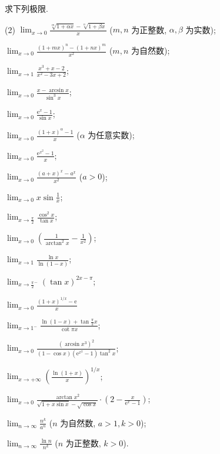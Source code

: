 \begin{exercise}[3.4.5]
    求下列极限.
    \begin{tasks}(2)
        \task* $\displaystyle \lim_{x \to 0} \frac{\sqrt[m]{1 + \alpha x} - \sqrt[n]{1 + \beta x}}{x}$ ($m, n$ 为正整数, $\alpha, \beta$ 为实数);

        \task* $\displaystyle \lim_{x \to 0} \frac{(1 + m x)^n - (1 + n x)^m}{x^2}$ ($m, n$ 为自然数);

        \task
        $\displaystyle \lim_{x \to 1} \frac{x^3 + x - 2}{x^2 - 3x + 2}$;

        \task
        $\displaystyle \lim_{x \to 0} \frac{x - \arcsin x}{\sin^3 x}$;

        \task
        $\displaystyle \lim_{x \to 0} \frac{\mathrm{e}^x - 1}{\sin x}$;

        \task
        $\displaystyle \lim_{x \to 0} \frac{(1 + x)^\alpha - 1}{x}$ ($\alpha$ 为任意实数);

        \task
        $\displaystyle \lim_{x \to 0} \frac{\mathrm{e}^{x^2} - 1}{x}$;

        \task
        $\displaystyle \lim_{x \to 0} \frac{(a + x)^x - a^x}{x^2}$ ($a > 0$);

        \task
        $\displaystyle \lim_{x \to 0} x \sin \frac{1}{x}$;

        \task
        $\displaystyle \lim_{x \to \frac{\pi}{2}} \frac{\cos^2 x}{\tan x}$;

        \task
        $\displaystyle \lim_{x \to 0} \left(\frac{1}{\arctan^2 x} - \frac{1}{x^2}\right)$;

        \task
        $\displaystyle \lim_{x \to 1} \frac{\ln x}{\ln (1 - x)}$;

        \task
        $\displaystyle \lim_{x \to \frac{\pi}{2}^-} (\tan x)^{2x - \pi}$;

        \task
        $\displaystyle \lim_{x \to 0} \frac{\left(1 + x\right)^{1/x} - \mathrm{e}}{x}$ %

        \task
        $\displaystyle \lim_{x \to 1^-} \frac{\ln(1 - x) + \tan \frac{\pi}{2} x}{\cot \pi x}$;

        \task
        $\displaystyle \lim_{x \to 0} \frac{(\arcsin x^3)^2}{(1 - \cos x)(\mathrm{e}^{x^2} - 1) \tan^2 x}$;

        \task
        $\displaystyle \lim_{x \to +\infty} \left(\frac{\ln(1 + x)}{x}\right)^{1/x}$;

        \task
        $\displaystyle \lim_{x \to 0} \frac{\arctan x^2}{\sqrt{1 + x \sin x} - \sqrt{\cos x}} \cdot \left(2 - \frac{x}{\mathrm{e}^x - 1}\right)$;

        \task* $\displaystyle \lim_{n \to \infty} \frac{n^k}{a^n}$ ($n$ 为自然数, $a > 1, k > 0$);

        \task* $\displaystyle \lim_{n \to \infty} \frac{\ln n}{n^k}$ ($n$ 为正整数, $k > 0$).
    \end{tasks}
\end{exercise}

